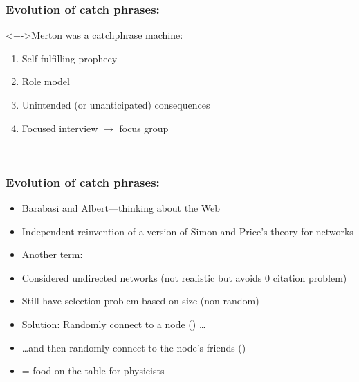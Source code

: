 \begin{frame}
  \frametitle{Evolution of catch phrases:}

  \begin{block}<+->{Merton was a catchphrase machine:}
  \begin{enumerate}
  \item<+-> 
    Self-fulfilling prophecy
  \item<+-> 
    Role model
  \item<+-> 
    Unintended (or unanticipated) consequences
  \item<+-> 
    Focused interview $\rightarrow$ focus group
  \end{enumerate}

  \\
  \medskip
  \end{block}

\end{frame}

\begin{frame}
  \frametitle{Evolution of catch phrases:}

  \begin{block}{}
  \begin{itemize}
  \item<+-> 
    Barabasi and Albert\cite{barabasi1999a}---thinking about the Web
  \item<+-> 
    Independent reinvention of a version of Simon and Price's theory for networks
  \item<+-> 
    Another term: 
  \item<+-> 
    Considered undirected networks (not realistic but avoids 0 citation problem)
  \item<+-> 
    Still have selection problem based on size (non-random)
  \item<+-> 
    Solution: Randomly connect to a node () \ldots
  \item<+-> 
    \ldots and then randomly connect to the node's friends ()
  \item<+-> 
     = food on the table for physicists
  \end{itemize}
  \end{block}
  
\end{frame}

